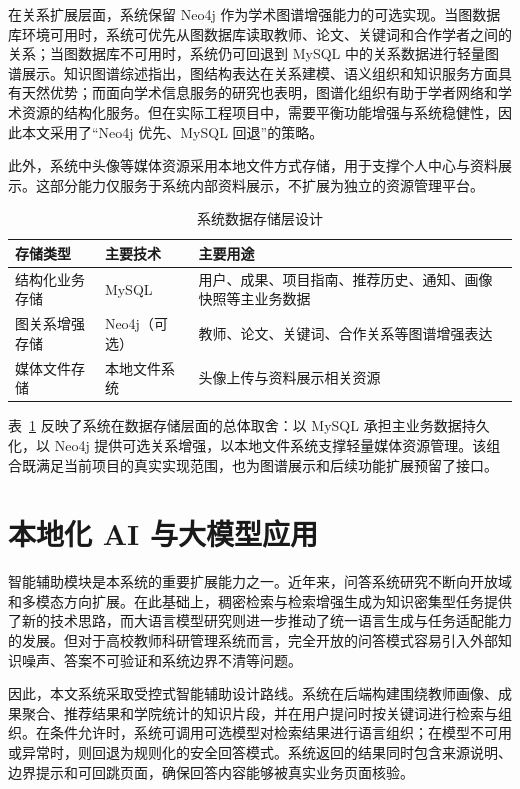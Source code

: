 \documentclass[12pt,a4paper]{ctexbook}
\begin{document}
在关系扩展层面，系统保留 Neo4j 作为学术图谱增强能力的可选实现。当图数据库环境可用时，系统可优先从图数据库读取教师、论文、关键词和合作学者之间的关系；当图数据库不可用时，系统仍可回退到 MySQL 中的关系数据进行轻量图谱展示。知识图谱综述指出，图结构表达在关系建模、语义组织和知识服务方面具有天然优势\cite{kg_survey_foreign_2021}\cite{kg_general_survey}；而面向学术信息服务的研究也表明，图谱化组织有助于学者网络和学术资源的结构化服务\cite{academic_kg_service_2018}。但在实际工程项目中，需要平衡功能增强与系统稳健性，因此本文采用了“Neo4j 优先、MySQL 回退”的策略。

此外，系统中头像等媒体资源采用本地文件方式存储，用于支撑个人中心与资料展示。这部分能力仅服务于系统内部资料展示，不扩展为独立的资源管理平台。

\begin{table}[H]
  \centering
  \caption{系统数据存储层设计}
  \label{tab:data-storage-design}
  \begin{tabular}{p{3cm}p{4cm}p{5cm}}
    \toprule
    存储类型 & 主要技术 & 主要用途 \\
    \midrule
    结构化业务存储 & MySQL & 用户、成果、项目指南、推荐历史、通知、画像快照等主业务数据 \\
    图关系增强存储 & Neo4j（可选） & 教师、论文、关键词、合作关系等图谱增强表达 \\
    媒体文件存储 & 本地文件系统 & 头像上传与资料展示相关资源 \\
    \bottomrule
  \end{tabular}
\end{table}

表~\ref{tab:data-storage-design} 反映了系统在数据存储层面的总体取舍：以 MySQL 承担主业务数据持久化，以 Neo4j 提供可选关系增强，以本地文件系统支撑轻量媒体资源管理。该组合既满足当前项目的真实实现范围，也为图谱展示和后续功能扩展预留了接口。

\section{本地化 AI 与大模型应用}
智能辅助模块是本系统的重要扩展能力之一。近年来，问答系统研究不断向开放域和多模态方向扩展\cite{qa_system_survey_2023}。在此基础上，稠密检索与检索增强生成为知识密集型任务提供了新的技术思路\cite{dpr_2020}\cite{rag_2021}，而大语言模型研究则进一步推动了统一语言生成与任务适配能力的发展\cite{llm_survey_2023}。但对于高校教师科研管理系统而言，完全开放的问答模式容易引入外部知识噪声、答案不可验证和系统边界不清等问题。

因此，本文系统采取受控式智能辅助设计路线。系统在后端构建围绕教师画像、成果聚合、推荐结果和学院统计的知识片段，并在用户提问时按关键词进行检索与组织。在条件允许时，系统可调用可选模型对检索结果进行语言组织；在模型不可用或异常时，则回退为规则化的安全回答模式。系统返回的结果同时包含来源说明、边界提示和可回跳页面，确保回答内容能够被真实业务页面核验。
\end{document}
